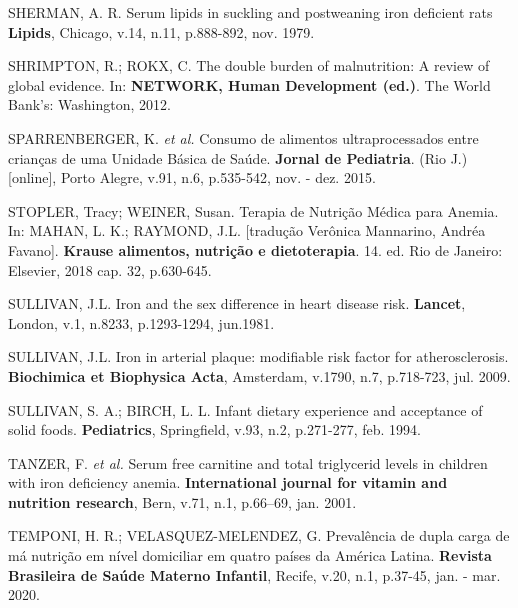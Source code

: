 \bigbreak

\noindent SHERMAN, A. R. Serum lipids in suckling and postweaning iron deficient rats \textbf{Lipids}, Chicago, v.14, n.11, p.888-892, nov. 1979.

\bigbreak

\noindent SHRIMPTON, R.; ROKX, C. The double burden of malnutrition: A review of global evidence. In: \textbf{NETWORK, Human Development (ed.)}. The World Bank’s: Washington, 2012.

\bigbreak

\noindent SPARRENBERGER, K. \textit{et al.} Consumo de alimentos ultraprocessados entre crianças de uma Unidade Básica de Saúde. \textbf{Jornal de Pediatria}. (Rio J.) [online], Porto Alegre, v.91, n.6, p.535-542, nov. - dez. 2015.

\bigbreak

\noindent STOPLER, Tracy; WEINER, Susan. Terapia de Nutrição Médica para Anemia. In: MAHAN, L. K.; RAYMOND, J.L. [tradução Verônica Mannarino, Andréa Favano]. \textbf{Krause alimentos, nutrição e dietoterapia}. 14. ed. Rio de Janeiro: Elsevier, 2018 cap. 32, p.630-645.

\bigbreak

\noindent SULLIVAN, J.L. Iron and the sex difference in heart disease risk. \textbf{Lancet}, London, v.1, n.8233, p.1293-1294, jun.1981.

\bigbreak

\noindent SULLIVAN, J.L. Iron in arterial plaque: modifiable risk factor for atherosclerosis. \textbf{Biochimica et Biophysica Acta}, Amsterdam, v.1790, n.7, p.718-723, jul. 2009.

\bigbreak

\noindent SULLIVAN, S. A.; BIRCH, L. L. Infant dietary experience and acceptance of solid foods. \textbf{Pediatrics}, Springfield, v.93, n.2, p.271-277, feb. 1994. 

\bigbreak

\noindent TANZER, F. \textit{et al.} Serum free carnitine and total triglycerid levels in children with iron deficiency anemia. \textbf{International journal for vitamin and nutrition research}, Bern, v.71, n.1, p.66–69, jan. 2001.

\bigbreak

\noindent TEMPONI, H. R.; VELASQUEZ-MELENDEZ, G. Prevalência de dupla carga de má nutrição em nível domiciliar em quatro países da América Latina. \textbf{Revista Brasileira de Saúde Materno Infantil}, Recife, v.20, n.1, p.37-45, jan. - mar. 2020.

